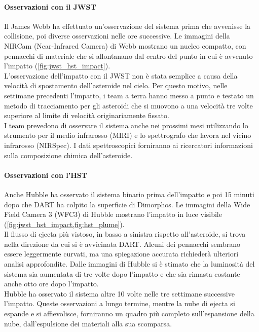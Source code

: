 \paragraph*{Osservazioni con il JWST}
Il James Webb ha effettuato un'osservazione del sistema prima che avvenisse la collisione, poi diverse osservazioni nelle ore successive. Le immagini della NIRCam (Near-Infrared Camera) di Webb mostrano un nucleo compatto, con pennacchi di materiale che si allontanano dal centro del punto in cui è avvenuto l'impatto (\cref{fig:jwst_hst_impact}).\\
L'osservazione dell'impatto con il JWST non è stata semplice a causa della velocità di spostamento dell'asteroide nel cielo. Per questo motivo, nelle settimane precedenti l'impatto, i team a terra hanno messo a punto e testato un metodo di tracciamento per gli asteroidi che si muovono a una velocità tre volte superiore al limite di velocità originariamente fissato.\\
I team prevedono di osservare il sistema anche nei prossimi mesi utilizzando lo strumento per il medio infrarosso (MIRI) e lo spettrografo che lavora nel vicino infrarosso (NIRSpec). I dati spettroscopici forniranno ai ricercatori informazioni sulla composizione chimica dell'asteroide.

\paragraph*{Osservazioni con l'HST}
Anche Hubble ha osservato il sistema binario prima dell'impatto e poi 15 minuti dopo che DART ha colpito la superficie di Dimorphos. Le immagini della Wide Field Camera 3 (WFC3) di Hubble mostrano l'impatto in luce visibile (\cref{fig:jwst_hst_impact,fig:hst_plume}).\\
Il flusso di ejecta più vistoso, in basso a sinistra rispetto all'asteroide, si trova nella direzione da cui si è avvicinata DART. Alcuni dei pennacchi sembrano essere leggermente curvati, ma una spiegazione accurata richiederà ulteriori analisi approfondite. Dalle immagini di Hubble si è stimato che la luminosità del sistema sia aumentata di tre volte dopo l'impatto e che sia rimasta costante anche otto ore dopo l'impatto.\\
Hubble ha osservato il sistema altre 10 volte nelle tre settimane successive l'impatto. Queste osservazioni a lungo termine, mentre la nube di ejecta si espande e si affievolisce, forniranno un quadro più completo sull'espansione della nube, dall'espulsione dei materiali alla sua scomparsa.

